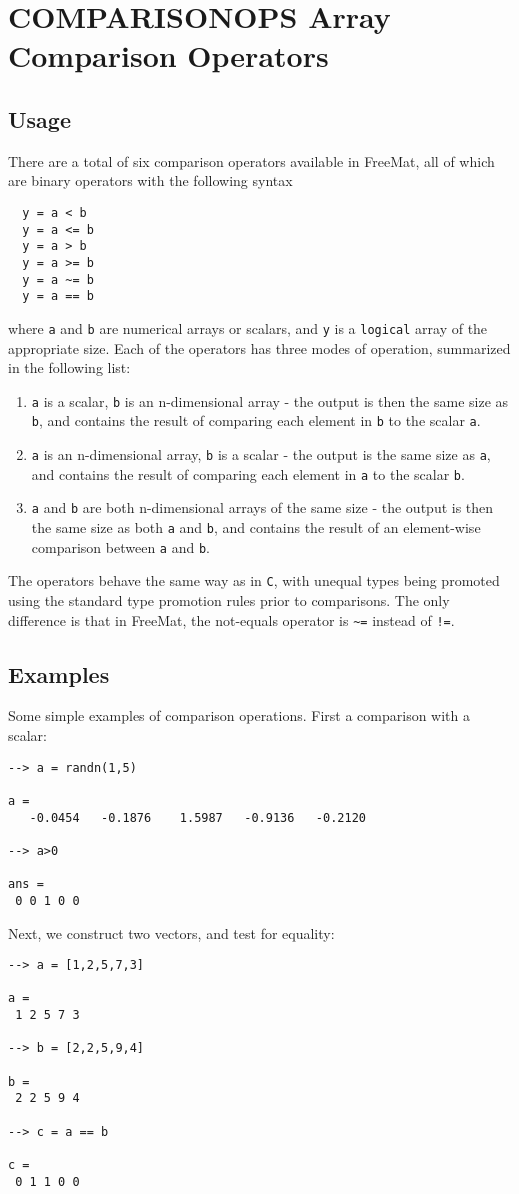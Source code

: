 \section{COMPARISONOPS Array Comparison Operators}

\subsection{Usage}

There are a total of six comparison operators available in FreeMat, all of which are binary operators with the following syntax
\begin{verbatim}
  y = a < b
  y = a <= b
  y = a > b
  y = a >= b
  y = a ~= b
  y = a == b
\end{verbatim}
where \verb|a| and \verb|b| are numerical arrays or scalars, and \verb|y| is a \verb|logical| array of the appropriate size.  Each of the operators has three modes of operation, summarized in the following list:
\begin{enumerate}
  \item \verb|a| is a scalar, \verb|b| is an n-dimensional array - the output is then the same size as \verb|b|, and contains the result of comparing each element in \verb|b| to the scalar \verb|a|.
  \item \verb|a| is an n-dimensional array, \verb|b| is a scalar - the output is the same size as \verb|a|, and contains the result of comparing each element in \verb|a| to the scalar \verb|b|.
  \item \verb|a| and \verb|b| are both n-dimensional arrays of the same size - the output is then the same size as both \verb|a| and \verb|b|, and contains the result of an element-wise comparison between \verb|a| and \verb|b|.
\end{enumerate}
The operators behave the same way as in \verb|C|, with unequal types being promoted using the standard type promotion rules prior to comparisons.  The only difference is that in FreeMat, the not-equals operator is \verb|~=| instead of \verb|!=|.
\subsection{Examples}

Some simple examples of comparison operations.  First a comparison with a scalar:
\begin{verbatim}
--> a = randn(1,5)

a = 
   -0.0454   -0.1876    1.5987   -0.9136   -0.2120 

--> a>0

ans = 
 0 0 1 0 0 
\end{verbatim}
Next, we construct two vectors, and test for equality:
\begin{verbatim}
--> a = [1,2,5,7,3]

a = 
 1 2 5 7 3 

--> b = [2,2,5,9,4]

b = 
 2 2 5 9 4 

--> c = a == b

c = 
 0 1 1 0 0 
\end{verbatim}
